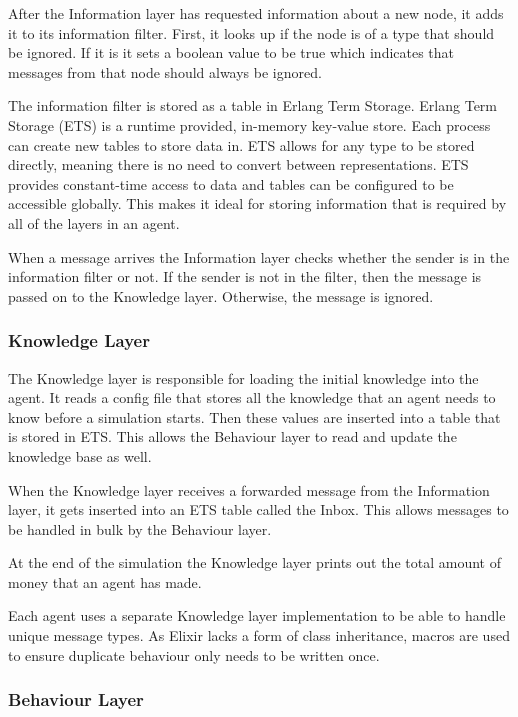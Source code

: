 After the Information layer has requested information about a new node, it adds it to its information filter.
First, it looks up if the node is of a type that should be ignored.
If it is it sets a boolean value to be true which indicates that messages from that node should always be ignored.

The information filter is stored as a table in Erlang Term Storage.
Erlang Term Storage (ETS) is a runtime provided, in-memory key-value store.
Each process can create new tables to store data in.
ETS allows for any type to be stored directly, meaning there is no need to convert between representations.
ETS provides constant-time access to data and tables can be configured to be accessible globally.
This makes it ideal for storing information that is required by all of the layers in an agent.

When a message arrives the Information layer checks whether the sender is in the information filter or not.
If the sender is not in the filter, then the message is passed on to the Knowledge layer.
Otherwise, the message is ignored.

\subsubsection{Knowledge Layer}

The Knowledge layer is responsible for loading the initial knowledge into the agent.
It reads a config file that stores all the knowledge that an agent needs to know before a simulation starts.
Then these values are inserted into a table that is stored in ETS\@.
This allows the Behaviour layer to read and update the knowledge base as well.

When the Knowledge layer receives a forwarded message from the Information layer, it gets inserted into an ETS table called the Inbox.
This allows messages to be handled in bulk by the Behaviour layer.

At the end of the simulation the Knowledge layer prints out the total amount of money that an agent has made.

Each agent uses a separate Knowledge layer implementation to be able to handle unique message types.
As Elixir lacks a form of class inheritance, macros are used to ensure duplicate behaviour only needs to be written once.

\subsubsection{Behaviour Layer}

